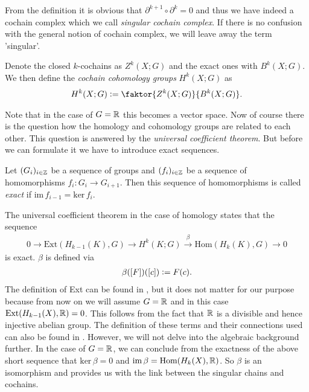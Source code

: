 \documentclass[../master_thesis.tex]{subfiles}
\begin{document}
From the definition it is obvious that $\partial^{k+1} \circ \partial^{k} = 0$ 
and thus we have indeed a cochain complex which we call \textit{singular cochain 
complex}. If there is no confusion with the general notion of cochain complex,
we will leave away the term 'singular'.
\begin{definition}
    Denote the closed $k$-cochains as $Z^k(X;G)$ and the 
    exact ones with $B^k(X;G)$. 
    We then define the \textit{cochain cohomology groups}
    $H^k(X;G)$ as
    \begin{align*}
        H^k(X;G) \vcentcolon= \faktor{Z^k(X;G)}{B^k(X;G)}.
    \end{align*}
\end{definition}
Note that in the case of $G = \mathbb{R}$ this becomes a vector space.
Now of course there is the question how the homology and cohomology groups 
are related to each other. This question is answered by the
\textit{universal coefficient theorem}. But before we can formulate it we have 
to introduce exact sequences.
\begin{definition} \label{def:exact_sequence}
    Let $(G_i)_{i\in \mathbb{Z}}$ be a sequence of groups and 
    $(f_i)_{i \in \mathbb{Z}}$ be a sequence of homomorphisms
    $f_i: G_i \rightarrow G_{i+1}$. Then this sequence of homomorphisms is
    called \textit{exact} if $\text{im}\,f_{i-1} = \text{ker}\,f_i$.
\end{definition}

The universal coefficient theorem in the case of homology states
that the sequence 
\begin{align}
    0 \rightarrow \text{Ext}(H_{k-1}(K),G) \rightarrow 
    H^k(K;G) \xrightarrow{\beta} \text{Hom}(H_k(K),G) 
    \rightarrow 0 \label{eq:univeral_coefficient_theorem}
\end{align}
is exact. 
$\beta$ is defined via 
\begin{align}
    \beta([F])([c]) \vcentcolon= F(c).
    \label{eq:isomorphism_from_universal_coefficient_theorem}
\end{align}
The definition of Ext can be found in \cite[Sec.\,V.6]{topology_and_geometry},
but it does not matter for our purpose because from now on we will assume
$G = \mathbb{R}$ and in this case
$\text{Ext}(H_{k-1}(X),\mathbb{R}) = 0$. This follows from the fact that 
$\mathbb{R}$ is a divisible and hence injective abelian group. The definition of
these terms and their connections used can also be found in 
\cite[Sec.\,V.6]{topology_and_geometry}. However, we will not delve into the 
algebraic background further. In the case of $G = \mathbb{R}$, 
we can conclude from the exactness of the 
above short sequence that $\text{ker}\,\beta = 0$ and 
$\text{im}\,\beta = \text{Hom}(H_k(X),\mathbb{R})$. So $\beta$ is an isomorphism 
and provides us with the link between the singular chains and cochains.
\end{document}
